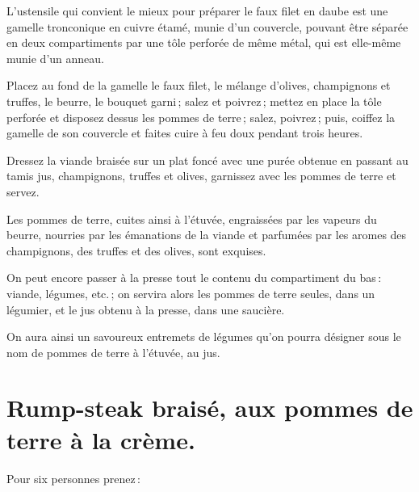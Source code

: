 L'ustensile qui convient le mieux pour préparer le faux filet en daube est une
gamelle tronconique en cuivre étamé, munie d'un couvercle, pouvant être séparée
en deux compartiments par une tôle perforée de même métal, qui est elle-même
munie d'un anneau.

Placez au fond de la gamelle le faux filet, le mélange d'olives, champignons et
truffes, le beurre, le bouquet garni ; salez et poivrez ; mettez en place la
tôle perforée et disposez dessus les pommes de terre ; salez, poivrez ; puis,
coiffez la gamelle de son couvercle et faites cuire à feu doux pendant trois
heures.

Dressez la viande braisée sur un plat foncé avec une purée obtenue en passant
au tamis jus, champignons, truffes et olives, garnissez avec les pommes de
terre et servez.

Les pommes de terre, cuites ainsi à l'étuvée, engraissées par les vapeurs du
beurre, nourries par les émanations de la viande et parfumées par les aromes
des champignons, des truffes et des olives, sont exquises.

\sk

On peut encore passer à la presse tout le contenu du compartiment du bas :
viande, légumes, etc. ; on servira alors les pommes de terre seules, dans un
légumier, et le jus obtenu à la presse, dans une saucière.

On aura ainsi un savoureux entremets de légumes qu'on pourra désigner sous le
nom de pommes de terre à l'étuvée, au jus.

\section*{\centering Rump-steak braisé, aux pommes de terre à la crème.}
{}

Pour six personnes prenez :

\medskip


